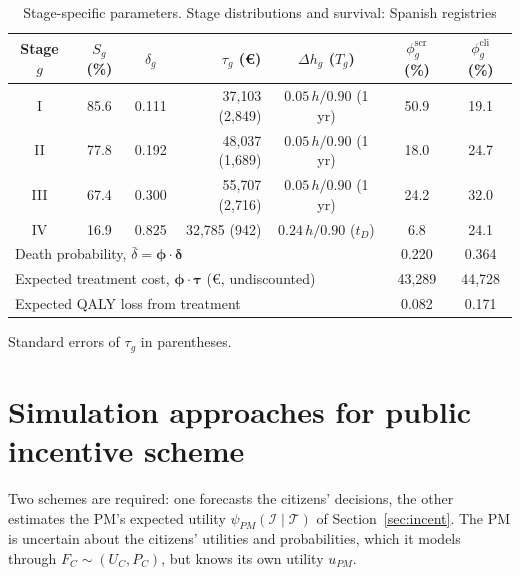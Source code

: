 \documentclass[12pt]{article}
\begin{document}
\begin{table}[h!]
\centering
\footnotesize
\caption{Stage-specific parameters. Stage distributions and survival: Spanish registries}
\label{tab:death_prob}
\begin{tabular}{c c c r c c c}
\toprule
\textbf{Stage $g$} & \textbf{$S_g$ (\%)} & \textbf{$\delta_g$} & \textbf{$\tau_g$ (€)} & \textbf{$\Delta h_g$ ($T_g$)} & \textbf{$\phi^{\text{scr}}_g$ (\%)} & \textbf{$\phi^{\text{cli}}_g$ (\%)} \\
\midrule
I   & 85.6 & 0.111 & 37{,}103 (2{,}849) & $0.05\,h/0.90$ (1 yr)  & 50.9 & 19.1 \\
II  & 77.8 & 0.192 & 48{,}037 (1{,}689) & $0.05\,h/0.90$ (1 yr)  & 18.0 & 24.7 \\
III & 67.4 & 0.300 & 55{,}707 (2{,}716) & $0.05\,h/0.90$ (1 yr)  & 24.2 & 32.0 \\
IV  & 16.9 & 0.825 & 32{,}785 (942)      & $0.24\,h/0.90$ ($t_D$) &  6.8 & 24.1 \\
\midrule
\multicolumn{5}{l}{Death probability, $\bar\delta = \boldsymbol{\phi} \cdot \boldsymbol{\delta}$} & 0.220 & 0.364 \\
\multicolumn{5}{l}{Expected treatment cost, $\boldsymbol{\phi} \cdot \boldsymbol{\tau}$ (€, undiscounted)} & 43{,}289 & 44{,}728 \\
\multicolumn{5}{l}{Expected QALY loss from treatment} & 0.082 & 0.171 \\
\bottomrule
\end{tabular}

\vspace{2pt}
\raggedright\scriptsize
Standard errors of $\tau_g$ in parentheses.
\end{table}

\section{Simulation approaches for public incentive scheme}\label{app:simulation_public}
Two schemes are required: one forecasts the citizens' decisions, the other estimates the PM's expected utility $\psi_{PM}(\mathcal{I} \mid \mathcal{T})$ of Section~\ref{sec:incent}. The PM is uncertain about the citizens' utilities and probabilities, which it models through $F_C \sim (U_C, P_C)$, but knows its own utility $u_{PM}$.
\end{document}
